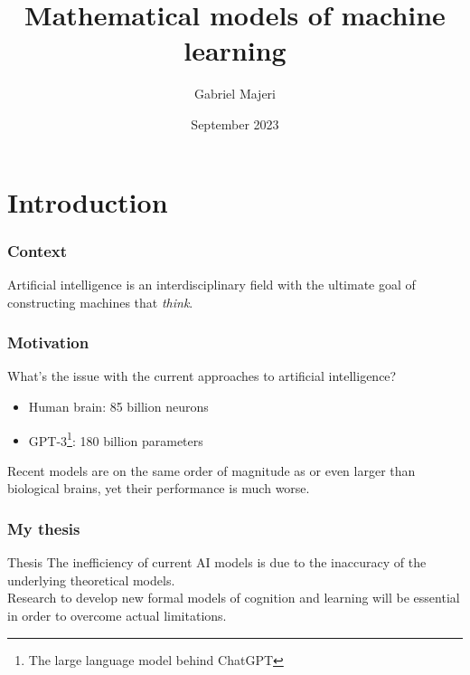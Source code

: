 \documentclass{beamer}
\title{Mathematical models of machine learning}
\author{Gabriel Majeri}
\date{September 2023}
\theoremstyle{definition}
\begin{document}
\maketitle

\section{Introduction}

\begin{frame}
\frametitle{Context}

Artificial intelligence is an interdisciplinary field with the ultimate goal of constructing machines that \emph{think}.

\end{frame}



\begin{frame}
\frametitle{Motivation}

What's the issue with the current approaches to artificial intelligence?

\begin{itemize}
    \item Human brain: 85 billion neurons
    \item GPT-3\footnote{The large language model behind ChatGPT}: 180 billion parameters
\end{itemize}

Recent models are on the same order of magnitude as or even larger than biological brains, yet their performance is much worse.
\end{frame}

\begin{frame}
\frametitle{My thesis}

\begin{block}{Thesis}
The inefficiency of current AI models is due to the inaccuracy of the underlying theoretical models. \\[1em]

Research to develop new formal models of cognition and learning will be essential in order to overcome actual limitations.
\end{block}
\end{frame}
\end{document}

